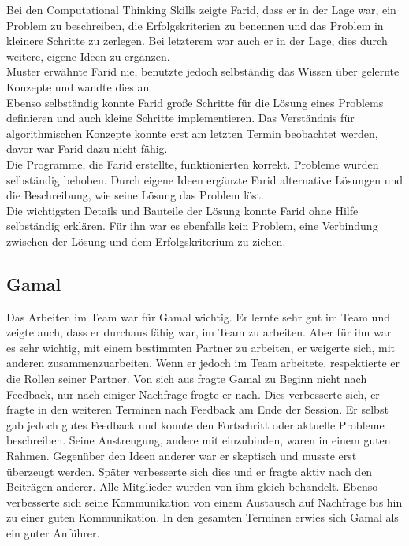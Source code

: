 Bei den Computational Thinking Skills zeigte Farid, dass er in der Lage war, ein Problem zu beschreiben, die Erfolgskriterien zu benennen und das Problem in kleinere Schritte zu zerlegen. Bei letzterem war auch er in der Lage, dies durch weitere, eigene Ideen zu ergänzen.\\
Muster erwähnte Farid nie, benutzte jedoch selbständig das Wissen über gelernte Konzepte und wandte dies an.\\
Ebenso selbständig konnte Farid große Schritte für die Lösung eines Problems definieren und auch kleine Schritte implementieren. Das Verständnis für algorithmischen Konzepte konnte erst am letzten Termin beobachtet werden, davor war Farid dazu nicht fähig.\\
Die Programme, die Farid erstellte, funktionierten korrekt. Probleme wurden selbständig behoben. Durch eigene Ideen ergänzte Farid alternative Lösungen und die Beschreibung, wie seine Lösung das Problem löst.\\
Die wichtigsten Details und Bauteile der Lösung konnte Farid ohne Hilfe selbständig erklären. Für ihn war es ebenfalls kein Problem, eine Verbindung zwischen der Lösung und dem Erfolgskriterium zu ziehen. 

\subsection{Gamal}
Das Arbeiten im Team war für Gamal wichtig. Er lernte sehr gut im Team und zeigte auch, dass er durchaus fähig war, im Team zu arbeiten. Aber für ihn war es sehr wichtig, mit einem bestimmten Partner zu arbeiten, er weigerte sich, mit anderen zusammenzuarbeiten. Wenn er jedoch im Team arbeitete, respektierte er die Rollen seiner Partner. Von sich aus fragte Gamal zu Beginn nicht nach Feedback, nur nach einiger Nachfrage fragte er nach. Dies verbesserte sich, er fragte in den weiteren Terminen nach Feedback am Ende der Session. Er selbst gab jedoch gutes Feedback und konnte den Fortschritt oder aktuelle Probleme beschreiben. Seine Anstrengung, andere mit einzubinden, waren in einem guten Rahmen. Gegenüber den Ideen anderer war er skeptisch und musste erst überzeugt werden. Später verbesserte sich dies und er fragte aktiv nach den Beiträgen anderer. Alle Mitglieder wurden von ihm gleich behandelt. Ebenso verbesserte sich seine Kommunikation von einem Austausch auf Nachfrage bis hin zu einer guten Kommunikation. In den gesamten Terminen erwies sich Gamal als ein guter Anführer. 